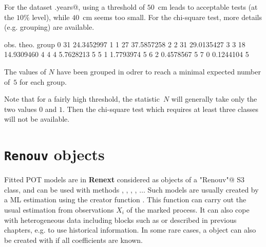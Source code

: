 \documentclass[a4paper]{report}
\newcommand{\pkg}[1]{\textbf{#1}}
\begin{document}
\noindent
For the dataset \verb@Brest.years@, using a threshold of $50$~cm leads to
acceptable tests (at the $10\%$ level), while $40$~cm seems too small. 
For the chi-square test, more details (e.g. grouping) are available. 

\begin{Schunk}
\begin{Soutput}
  obs.      theo. group
0   31 24.3452997     1
1   27 37.5857258     2
2   31 29.0135427     3
3   18 14.9309460     4
4    4  5.7628213     5
5    1  1.7793974     5
6    2  0.4578567     5
7    0  0.1244104     5
\end{Soutput}
\end{Schunk}

\noindent
The values of $N$ have been grouped in odrer to reach a minimal expected
number of~$5$ for each group.

Note that for a fairly high threshold, the statistic~$N$ will
generally take only the two values $0$ and $1$. Then the chi-square
test which requires at least three classes will not be available.
\chapter{\texttt{Renouv} objects}

\label{Chap-Renouv}
  
Fitted POT models are in \pkg{Renext} considered as objects of a
\verb@"Renouv"@ S3 class, and can be used with methods \verb@coef@,
\verb@vcov@, \verb@plot@, \verb@predict@, $\dots$ Such models are
usually created by a ML estimation using the creator function
\verb@Renouv@. This function can carry out the usual estimation from
observations $X_i$ of the marked process. It can also cope with
heterogeneous data including blocks such as \verb@MAXdata@ or
\verb@OTSdata@ described in previous chapters, e.g. to use historical
information. In some rare cases, a \verb@Renouv@ object can also be
created with \verb@RenouvNoEst@ if all coefficients are known.


  
\end{document}

